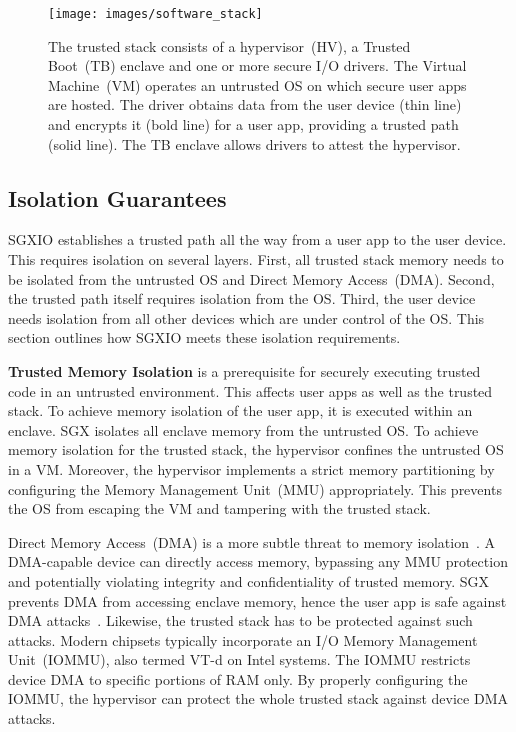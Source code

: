 \documentclass{sig-alternate-05-2015}
\newcommand{\VTd}{\mbox{VT-d}}
\begin{document}
\begin{figure}
\centering
\texttt{[image: images/software\_stack]}
\caption{The trusted stack consists of a hypervisor~(HV), a Trusted Boot~(TB) enclave and one or more secure I/O drivers. 
The Virtual Machine~(VM) operates an untrusted OS on which secure user apps are hosted. 
The driver obtains data from the user device (thin line) and encrypts it (bold line) for a user app, providing a trusted path (solid line). 
The TB enclave allows drivers to attest the hypervisor.}
\label{fig:sw_stack}
\end{figure}


\subsection{Isolation Guarantees}\label{sec:isolation}

SGXIO establishes a trusted path all the way from a user app to the user device. 
This requires isolation on several layers. 
First, all trusted stack memory needs to be isolated from the untrusted OS and Direct Memory Access~(DMA). 
Second, the trusted path itself requires isolation from the OS. 
Third, the user device needs isolation from all other devices which are under control of the OS. 
This section outlines how SGXIO meets these isolation requirements.

\textbf{Trusted Memory Isolation} is a prerequisite for securely executing trusted code in an untrusted environment. 
This affects user apps as well as the trusted stack. 
To achieve memory isolation of the user app, it is executed within an enclave. 
SGX isolates all enclave memory from the untrusted OS. 
To achieve memory isolation for the trusted stack, the hypervisor confines the untrusted OS in a VM. 
Moreover, the hypervisor implements a strict memory partitioning by configuring the Memory Management Unit~(MMU) appropriately. 
This prevents the OS from escaping the VM and tampering with the trusted stack. 

Direct Memory Access~(DMA) is a more subtle threat to memory isolation~\cite{zhou_building_2012}. 
A DMA-capable device can directly access memory, bypassing any MMU protection and potentially violating integrity and confidentiality of trusted memory. 
SGX prevents DMA from accessing enclave memory, hence the user app is safe against DMA attacks~\cite{sgxmanual}. 
Likewise, the trusted stack has to be protected against such attacks. 
Modern chipsets typically incorporate an I/O Memory Management Unit~(IOMMU), also termed \VTd{} on Intel systems. 
The IOMMU restricts device DMA to specific portions of RAM only. 
By properly configuring the IOMMU, the hypervisor can protect the whole trusted stack against device DMA attacks.
\end{document}
